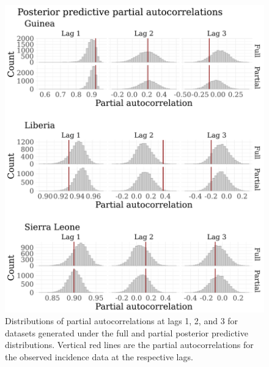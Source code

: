 \begin{figure}[htbp]
	\begin{fullpage}
		\centering
		\includegraphics[width=0.8\linewidth]{figures/ebola_synth_pacfs}
			\caption[Posterior predictive distributions of partial autocorrelations for a stratified SEIR model fit to a simulated Ebola outbreak.]{Distributions of partial autocorrelations at lags 1, 2, and 3 for datasets generated under the full and partial posterior predictive distributions. Vertical red lines are the partial autocorrelations for the observed incidence data at the respective lags.}
		\label{fig:ebola_synth_pacfs}
	\end{fullpage}
\end{figure}

